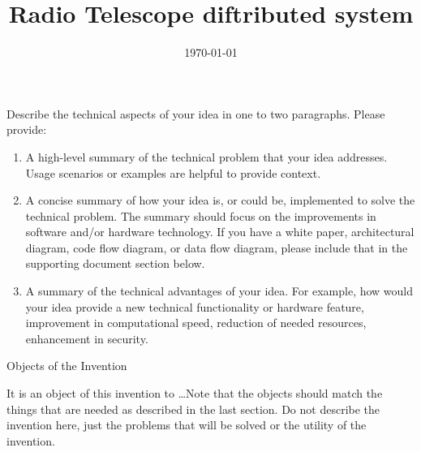 \documentclass[english]{uspatent}
\begin{document}
\setPrintingModeDraft



\title{Radio Telescope diftributed system}
\date{\today}
\maketitle
\tableofcontents
\newpage
Describe the technical aspects of your idea in one to two paragraphs. Please provide:
\patentParagraph

\begin{enumerate}
	\item A high-level summary of the technical problem that your idea addresses. Usage scenarios or examples are helpful to provide context.
	\item A concise summary of how your idea is, or could be, implemented to solve the technical problem. The summary should focus on the improvements in software and/or hardware technology. If you have a white paper, architectural diagram, code flow diagram, or data flow diagram, please include that in the supporting document section below.
	\item A summary of the technical advantages of your idea. For example, how would your idea provide a new technical functionality or hardware feature, improvement in computational speed, reduction of needed resources, enhancement in security.
\end{enumerate}

\patentParagraph Objects of the Invention

\patentParagraph It is an object of this invention to \ldots Note that the objects should match the things that are needed as described in the last section. Do not describe the invention here, just the problems that will be solved or the utility of the invention.
\end{document}

